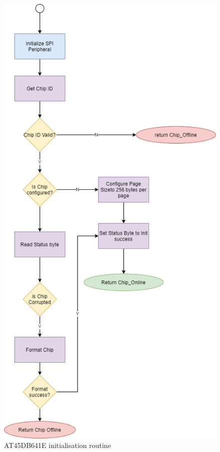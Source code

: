 \begin{figure}[H]
    \centering
    \includegraphics[scale=0.3]{Flash Chip Init Routine.png}
    \caption{AT45DB641E initialisation routine}
    \label{fig:Init_diagram_flash}
\end{figure}

